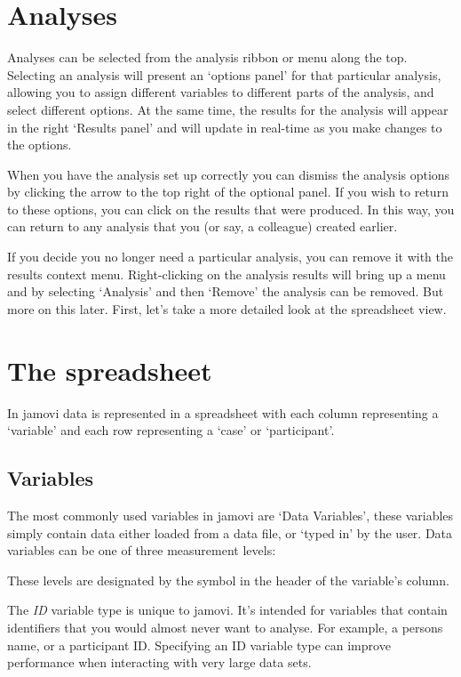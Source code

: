 \documentclass[
]{book}
\begin{document}
\hypertarget{analyses}{%
\section{Analyses}\label{analyses}}

Analyses can be selected from the analysis ribbon or menu along the top. Selecting an analysis will present an `options panel' for that particular analysis, allowing you to assign different variables to different parts of the analysis, and select different options. At the same time, the results for the analysis will appear in the right `Results panel' and will update in real-time as you make changes to the options.

When you have the analysis set up correctly you can dismiss the analysis options by clicking the arrow to the top right of the optional panel. If you wish to return to these options, you can click on the results that were produced. In this way, you can return to any analysis that you (or say, a colleague) created earlier.

If you decide you no longer need a particular analysis, you can remove it with the results context menu. Right-clicking on the analysis results will bring up a menu and by selecting `Analysis' and then `Remove' the analysis can be removed. But more on this later. First, let's take a more detailed look at the spreadsheet view.

\hypertarget{spreadsheet}{%
\section{The spreadsheet}\label{spreadsheet}}

In jamovi data is represented in a spreadsheet with each column representing a `variable' and each row representing a `case' or `participant'.

\hypertarget{variables}{%
\subsection{Variables}\label{variables}}

The most commonly used variables in jamovi are `Data Variables', these variables simply contain data either loaded from a data file, or `typed in' by the user. Data variables can be one of three measurement levels:

These levels are designated by the symbol in the header of the variable's column.

The \emph{ID} variable type is unique to jamovi. It's intended for variables that contain identifiers that you would almost never want to analyse. For example, a persons name, or a participant ID. Specifying an ID variable type can improve performance when interacting with very large data sets.
\end{document}
